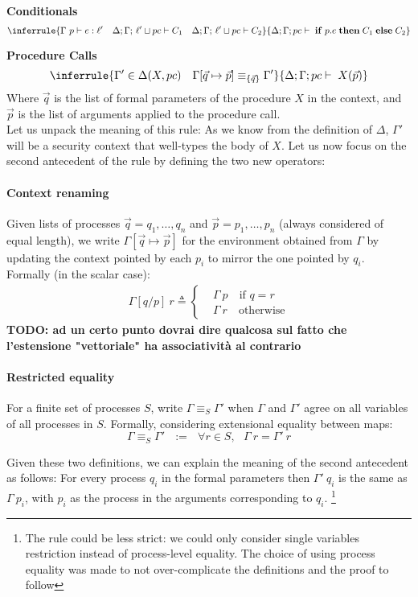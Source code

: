 \documentclass[12pt,a4paper,twoside]{book}
\begin{document}
\medskip
\noindent\textbf{Conditionals}
\[
  \inferrule
  { \Gamma~p \vdash e : \ell'
    \quad
    \Delta;\Gamma;\,\ell' \sqcup pc \vdash C_1
    \quad
    \Delta;\Gamma;\,\ell' \sqcup pc \vdash C_2 }
  {\Delta;\Gamma;pc \vdash \; \mathbf{if}\;p.e\;\mathbf{then}\;C_1\;\mathbf{else}\;C_2}
\]

\medskip
\noindent\textbf{Procedure Calls}
\[
  \inferrule
  { \Gamma' \in \Delta(X,pc) 
    \quad
    \Gamma[\vec{q}\mapsto \vec{p}] \equiv_{\{\vec{q}\}} \Gamma' }
  { \Delta;\Gamma;pc \vdash \; X(\vec{p})}
\]
Where $\vec{q}$ is the list of formal parameters of the procedure $X$ in the context, and $\vec{p}$ is the list of arguments applied to the procedure call.\\
Let us unpack the meaning of this rule:
As we know from the definition of $\Delta$, $\Gamma'$ will be a security context that well-types the body of $X$.
Let us now focus on the second antecedent of the rule by defining the two new operators:
\paragraph{Context renaming}
Given lists of processes $\vec{q} = q_1,\dots,q_n$ and $\vec{p} = p_1,\dots,p_n$ (always considered of equal length), we write
$\Gamma[\vec{q}\mapsto \vec{p}]$
for the environment obtained from $\Gamma$ by updating the context pointed by each $p_i$ to mirror the one pointed by $q_i$. Formally (in the scalar case):
\begin{align*}
	\Gamma[q/p]~r \triangleq
    \begin{cases}
    &\Gamma~p \quad \text{if $q = r$}\\
    &\Gamma~r \quad \text{otherwise}
    \end{cases}
\end{align*}
\textbf{TODO: ad un certo punto dovrai dire qualcosa sul fatto che l'estensione "vettoriale" ha associatività al contrario}
\paragraph{Restricted equality}
For a finite set of processes $S$, write $\Gamma \equiv_S \Gamma'$ when $\Gamma$ and $\Gamma'$ agree on all variables of all processes in $S$. Formally, considering extensional equality between maps:
$$ \Gamma \equiv_S \Gamma' ~~~:=~~~ \forall r \in S,~~~\Gamma~r = \Gamma'~r$$

Given these two definitions, we can explain the meaning of the second antecedent as follows: For every process $q_i$ in the formal parameters then $\Gamma'~q_i$ is the same as $\Gamma~p_i$, with $p_i$ as the process in the arguments corresponding to $q_i$. \footnote{The rule could be less strict: we could only consider single variables restriction instead of process-level equality. The choice of using process equality was made to not over-complicate the definitions and the proof to follow}
\end{document}
